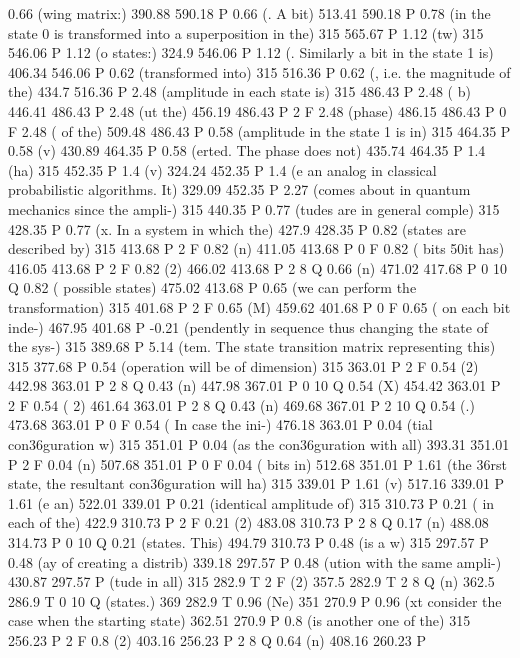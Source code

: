0.66 (wing matrix:) 390.88 590.18 P
0.66 (. A bit) 513.41 590.18 P
0.78 (in the state 0 is transformed into a superposition in the) 315 565.67 P
1.12 (tw) 315 546.06 P
1.12 (o states:) 324.9 546.06 P
1.12 (. Similarly a bit in the state 1 is) 406.34 546.06 P
0.62 (transformed into) 315 516.36 P
0.62 (, i.e. the magnitude of the) 434.7 516.36 P
2.48 (amplitude in each state is) 315 486.43 P
2.48 ( b) 446.41 486.43 P
2.48 (ut the) 456.19 486.43 P
2 F
2.48 (phase) 486.15 486.43 P
0 F
2.48 ( of the) 509.48 486.43 P
0.58 (amplitude in the state 1 is in) 315 464.35 P
0.58 (v) 430.89 464.35 P
0.58 (erted. The phase does not) 435.74 464.35 P
1.4 (ha) 315 452.35 P
1.4 (v) 324.24 452.35 P
1.4 (e an analog in classical probabilistic algorithms. It) 329.09 452.35 P
2.27 (comes about in quantum mechanics since the ampli-) 315 440.35 P
0.77 (tudes are in general comple) 315 428.35 P
0.77 (x. In a system in which the) 427.9 428.35 P
0.82 (states are described by) 315 413.68 P
2 F
0.82 (n) 411.05 413.68 P
0 F
0.82 ( bits \050it has) 416.05 413.68 P
2 F
0.82 (2) 466.02 413.68 P
2 8 Q
0.66 (n) 471.02 417.68 P
0 10 Q
0.82 ( possible states) 475.02 413.68 P
0.65 (we can perform the transformation) 315 401.68 P
2 F
0.65 (M) 459.62 401.68 P
0 F
0.65 ( on each bit inde-) 467.95 401.68 P
-0.21 (pendently in sequence thus changing the state of the sys-) 315 389.68 P
5.14 (tem. The state transition matrix representing this) 315 377.68 P
0.54 (operation will be of dimension) 315 363.01 P
2 F
0.54 (2) 442.98 363.01 P
2 8 Q
0.43 (n) 447.98 367.01 P
0 10 Q
0.54 (X) 454.42 363.01 P
2 F
0.54 ( 2) 461.64 363.01 P
2 8 Q
0.43 (n) 469.68 367.01 P
2 10 Q
0.54 (.) 473.68 363.01 P
0 F
0.54 ( In case the ini-) 476.18 363.01 P
0.04 (tial con\336guration w) 315 351.01 P
0.04 (as the con\336guration with all) 393.31 351.01 P
2 F
0.04 (n) 507.68 351.01 P
0 F
0.04 ( bits in) 512.68 351.01 P
1.61 (the \336rst state, the resultant con\336guration will ha) 315 339.01 P
1.61 (v) 517.16 339.01 P
1.61 (e an) 522.01 339.01 P
0.21 (identical amplitude of) 315 310.73 P
0.21 ( in each of the) 422.9 310.73 P
2 F
0.21 (2) 483.08 310.73 P
2 8 Q
0.17 (n) 488.08 314.73 P
0 10 Q
0.21 (states. This) 494.79 310.73 P
0.48 (is a w) 315 297.57 P
0.48 (ay of creating a distrib) 339.18 297.57 P
0.48 (ution with the same ampli-) 430.87 297.57 P
(tude in all) 315 282.9 T
2 F
(2) 357.5 282.9 T
2 8 Q
(n) 362.5 286.9 T
0 10 Q
(states.) 369 282.9 T
0.96 (Ne) 351 270.9 P
0.96 (xt consider the case when the starting state) 362.51 270.9 P
0.8 (is another one of the) 315 256.23 P
2 F
0.8 (2) 403.16 256.23 P
2 8 Q
0.64 (n) 408.16 260.23 P
